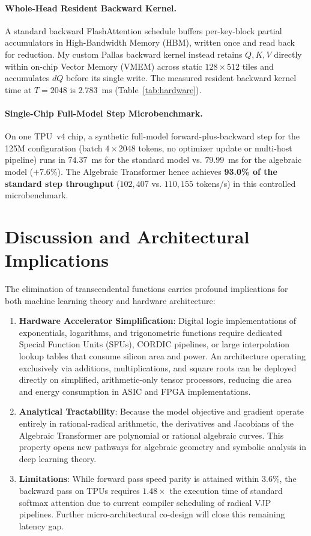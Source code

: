 \documentclass[11pt,a4paper]{article}
\theoremstyle{definition}
\begin{document}
\paragraph{Whole-Head Resident Backward Kernel.}
A standard backward FlashAttention schedule buffers per-key-block partial accumulators in High-Bandwidth Memory (HBM), written once and read back for reduction. My custom Pallas backward kernel instead retains $Q, K, V$ directly within on-chip Vector Memory (VMEM) across static $128 \times 512$ tiles and accumulates $dQ$ before its single write. The measured resident backward kernel time at $T=2048$ is $2.783$~ms (Table~\ref{tab:hardware}).

\paragraph{Single-Chip Full-Model Step Microbenchmark.}
On one TPU~v4 chip, a synthetic full-model forward-plus-backward step for the 125M configuration (batch $4 \times 2048$ tokens, no optimizer update or multi-host pipeline) runs in $74.37$~ms for the standard model vs. $79.99$~ms for the algebraic model ($+7.6\%$). The Algebraic Transformer hence achieves \textbf{93.0\% of the standard step throughput} ($102,407$ vs. $110,155$ tokens/s) in this controlled microbenchmark.

\section{Discussion and Architectural Implications}
\label{sec:discussion}

The elimination of transcendental functions carries profound implications for both machine learning theory and hardware architecture:
\begin{enumerate}
    \item \textbf{Hardware Accelerator Simplification}: Digital logic implementations of exponentials, logarithms, and trigonometric functions require dedicated Special Function Units (SFUs), CORDIC pipelines, or large interpolation lookup tables that consume silicon area and power. An architecture operating exclusively via additions, multiplications, and square roots can be deployed directly on simplified, arithmetic-only tensor processors, reducing die area and energy consumption in ASIC and FPGA implementations.
    \item \textbf{Analytical Tractability}: Because the model objective and gradient operate entirely in rational-radical arithmetic, the derivatives and Jacobians of the Algebraic Transformer are polynomial or rational algebraic curves. This property opens new pathways for algebraic geometry and symbolic analysis in deep learning theory.
    \item \textbf{Limitations}: While forward pass speed parity is attained within $3.6\%$, the backward pass on TPUs requires $1.48\times$ the execution time of standard softmax attention due to current compiler scheduling of radical VJP pipelines. Further micro-architectural co-design will close this remaining latency gap.
\end{enumerate}
\end{document}
